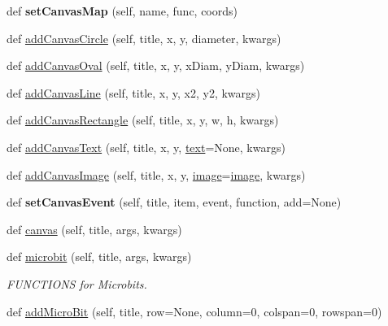 \begin{DoxyCompactItemize}
def {\bfseries set\+Canvas\+Map} (self, name, func, coords)
\item 
def \hyperlink{class_python_01_g_u_i_1_1appjar_1_1gui_a867b3dfc3ce4f596fce4bb61b6b78cbe}{add\+Canvas\+Circle} (self, title, x, y, diameter, kwargs)
\item 
def \hyperlink{class_python_01_g_u_i_1_1appjar_1_1gui_ab505c807c94a07499dbf9768d5902ad8}{add\+Canvas\+Oval} (self, title, x, y, x\+Diam, y\+Diam, kwargs)
\item 
def \hyperlink{class_python_01_g_u_i_1_1appjar_1_1gui_a09845cb7cec3f293e009538da74a8705}{add\+Canvas\+Line} (self, title, x, y, x2, y2, kwargs)
\item 
def \hyperlink{class_python_01_g_u_i_1_1appjar_1_1gui_a554332cd627dffd5029a63f0894752b7}{add\+Canvas\+Rectangle} (self, title, x, y, w, h, kwargs)
\item 
def \hyperlink{class_python_01_g_u_i_1_1appjar_1_1gui_aba1d445ab869c09e8841340ae7f3d59e}{add\+Canvas\+Text} (self, title, x, y, \hyperlink{class_python_01_g_u_i_1_1appjar_1_1gui_a6a060ddfec169e464326a0dd179a559e}{text}=None, kwargs)
\item 
def \hyperlink{class_python_01_g_u_i_1_1appjar_1_1gui_aa5272447b90193be89f1a6bd77219abe}{add\+Canvas\+Image} (self, title, x, y, \hyperlink{class_python_01_g_u_i_1_1appjar_1_1gui_a17243935a5285eba9b2b6b0eb3e9d86a}{image}=\hyperlink{class_python_01_g_u_i_1_1appjar_1_1gui_a17243935a5285eba9b2b6b0eb3e9d86a}{image}, kwargs)
\item 
\mbox{\label{class_python_01_g_u_i_1_1appjar_1_1gui_af54a09c0911e9c4a2d079857386bb478}} 
def {\bfseries set\+Canvas\+Event} (self, title, item, event, function, add=None)
\item 
def \hyperlink{class_python_01_g_u_i_1_1appjar_1_1gui_a99bb9230f919ddb5d2c40dec98e8688b}{canvas} (self, title, args, kwargs)
\item 
def \hyperlink{class_python_01_g_u_i_1_1appjar_1_1gui_aa8d8ccb547c3369c468f49d6dbc78147}{microbit} (self, title, args, kwargs)
\begin{DoxyCompactList}\small\item\em F\+U\+N\+C\+T\+I\+O\+NS for Microbits. \end{DoxyCompactList}\item 
def \hyperlink{class_python_01_g_u_i_1_1appjar_1_1gui_a2ea16e4a9a46582f47b6509cc82f4ce3}{add\+Micro\+Bit} (self, title, row=None, column=0, colspan=0, rowspan=0)
\item 

\end{DoxyCompactItemize}
